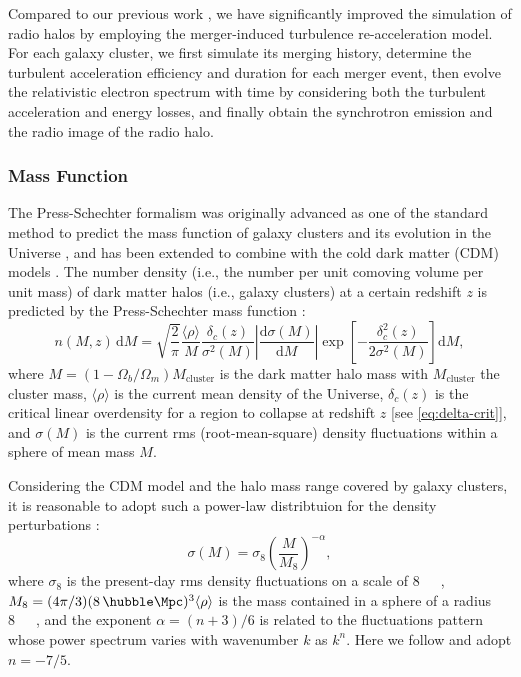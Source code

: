 \documentclass[modern]{aastex61}
\newcommand{\R}[1]{\mathrm{#1}}
\newcommand{\D}[1]{\R{d} #1}
\newcommand{\diff}[2]{\frac{\D{#1}}{\D{#2}}}
\begin{document}
Compared to our previous work \citep{wang2010},
we have significantly improved the simulation of radio halos by
employing the merger-induced turbulence re-acceleration model.
For each galaxy cluster, we first simulate its merging history,
determine the turbulent acceleration efficiency and duration for each
merger event, then evolve the relativistic electron spectrum with time
by considering both the turbulent acceleration and energy losses, and
finally obtain the synchrotron emission and the radio image of the
radio halo.

\subsubsection{Mass Function}
\label{sec:distributions}

The Press-Schechter formalism was originally advanced as one of the standard
method to predict the mass function of galaxy clusters and its evolution
in the Universe \citep{press1974}, and has been extended to combine with
the cold dark matter (CDM) models \citep[e.g.,][]{bond1991,lacey1993}.
The number density (i.e., the number per unit comoving volume per unit
mass) of dark matter halos (i.e., galaxy clusters) at a certain redshift
$z$ is predicted by the Press-Schechter mass function \citep{press1974}:
\begin{equation}
  \label{eq:ps-mass-func}
  n(M, z) \,\D{M} = \sqrt{\frac{2}{\pi}} \frac{\langle{\rho}\rangle}{M}
  \frac{\delta_c(z)}{\sigma^2(M)} \left| \diff{\sigma(M)}{M} \right|
  \exp\!\left[ -\frac{\delta_c^2(z)}{2\sigma^2(M)} \right] \D{M},
\end{equation}
where
$M = (1 - \Omega_b/\Omega_m) M_{\R{cluster}}$ is the dark matter halo mass
with $M_{\R{cluster}}$ the cluster mass,
$\langle {\rho} \rangle$ is the current mean density of the Universe,
$\delta_c(z)$ is the critical linear overdensity for a region to collapse
at redshift $z$ [see \autoref{eq:delta-crit}],
and $\sigma(M)$ is the current rms (root-mean-square) density fluctuations
within a sphere of mean mass $M$.

Considering the CDM model and the halo mass range covered by galaxy
clusters, it is reasonable to adopt such a power-law distribtuion
for the density perturbations \citep{sarazin2002,randall2002}:
\begin{equation}
  \label{eq:sigma-mass}
  \sigma(M) = \sigma_8 \left( \frac{M}{M_8} \right)^{-\alpha},
\end{equation}
where $\sigma_8$ is the present-day rms density fluctuations on a
scale of \SI{8}{\per\hubble\Mpc},
$M_8 = (4\pi/3)(8 \,\si{\per\hubble\Mpc})^3 \langle{\rho}\rangle$
is the mass contained in a sphere of a radius \SI{8}{\per\hubble\Mpc},
and the exponent $\alpha = (n+3)/6$ is related to the fluctuations
pattern whose power spectrum varies with wavenumber $k$ as $k^n$.
Here we follow \citet{randall2002} and adopt $n = -7/5$.
\end{document}
